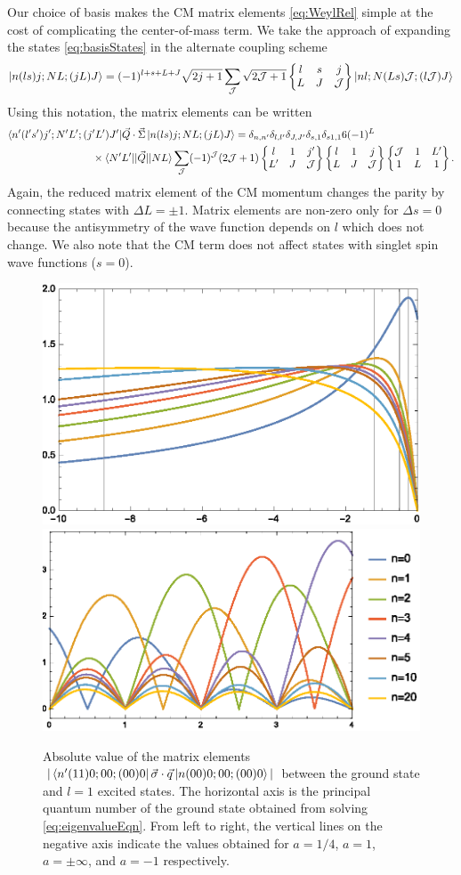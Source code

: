 \documentclass[%
 preprint,
 amsmath,amssymb,
 aps,
]{revtex4-1}
\newcommand{\sixj}[6]{ \begin{Bmatrix}
  #1 & #2 & #3 \\
  #4 & #5 & #6 
 \end{Bmatrix}}
\begin{document}
Our choice of basis makes the CM matrix elements \eqref{eq:WeylRel} simple at the cost of complicating the center-of-mass term. We take the approach of expanding the states \eqref{eq:basisStates} in the alternate coupling scheme 
\begin{equation}\label{eq:basisStates2}
\ket{n(ls)j;NL;(jL)J}=(-1)^{l+s+L+J}\sqrt{2j+1}\sum_{\mathcal{J}}\sqrt{2\mathcal{J}+1}\sixj{l}{s}{j}{L}{J}{\mathcal{J}}\ket{nl;N(Ls)\mathcal{J};(l\mathcal{J})J}
\end{equation}
Using this notation, the matrix elements can be written
\begin{equation}\begin{split}
\bra{n'(l's')j';N'L';(j'L')J'}&\vec{Q}\cdot\vec{\Sigma} \ket{n(ls)j;NL;(jL)J} = \delta_{n,n'}\delta_{l,l'}\delta_{J,J'}\delta_{s,1}\delta_{s1,1}   6 (-1)^{L} \\
&\hspace{-1cm}\times\braket{N'L'|| \vec{Q} || NL} \sum_{\mathcal{J}}(-1)^\mathcal{J} (2\mathcal{J}+1)\sixj{l}{1}{j'}{L'}{J}{\mathcal{J}}\sixj{l}{1}{j}{L}{J}{\mathcal{J}}\sixj{\mathcal{J}}{1}{L'}{1}{L}{1}.
\end{split}
\end{equation}
Again, the reduced matrix element of the CM momentum changes the parity by connecting states with $\Delta L=\pm1$. Matrix elements are non-zero only for $\Delta s=0$ because the antisymmetry of the wave function depends on $l$ which does not change. We also note that the CM term does not affect states with singlet spin wave functions ($s=0$).


\begin{figure}
\includegraphics[height=0.28\linewidth]{Figures/sigma_dot_q_mat_elts}\nobreak
\includegraphics[height=0.278\linewidth]{Figures/sigma_dot_q_mat_elts2}
\caption{\label{fig:matrixElts}Absolute value of the matrix elements $|\bra{n'(11)0;00;(00)0}\vec{\sigma}\cdot\vec{q}\ket{n(00)0;00;(00)0}|$ between the ground state and $l=1$ excited states. The horizontal axis is the principal quantum number of the ground state obtained from solving  \eqref{eq:eigenvalueEqn}. From left to right, the vertical lines on the negative axis indicate the values obtained for $a=1/4$, $a=1$, $a=\pm\infty$, and $a=-1$ respectively.} 
\end{figure}
\end{document}
